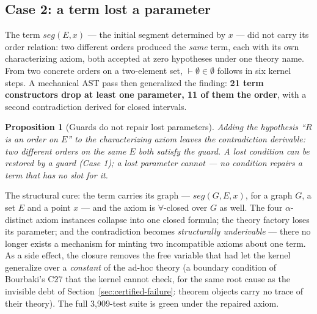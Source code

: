 \documentclass[11pt]{article}
\newtheorem{proposition}{Proposition}
\theoremstyle{remark}\newtheorem{example}{Example}
\begin{document}
\subsection{Case 2: a term lost a parameter}
The term $\mathit{seg}(E,x)$ --- the initial segment determined by $x$ --- did not carry its
order relation: two different orders produced the \emph{same} term, each with its own
characterizing axiom, both accepted at zero hypotheses under one theory name. From two
concrete orders on a two-element set, $\vdash \emptyset \in \emptyset$ follows in six
kernel steps. A mechanical AST pass then generalized the finding: \textbf{21 term
constructors drop at least one parameter, 11 of them the order}, with a second
contradiction derived for closed intervals.

\begin{proposition}[Guards do not repair lost parameters]
Adding the hypothesis ``$R$ is an order on $E$'' to the characterizing axiom leaves
the contradiction derivable: two \emph{different} orders on the same $E$ both satisfy
the guard. A lost \emph{condition} can be restored by a guard (Case 1); a lost
\emph{parameter} cannot --- no condition repairs a term that has no slot for it.
\end{proposition}

The structural cure: the term carries its graph --- $\mathit{seg}(G,E,x)$, for a
graph $G$, a set $E$ and a point $x$ --- and the axiom
is $\forall$-closed over $G$ as well. The four $\alpha$-distinct axiom instances
collapse into one closed formula; the theory factory loses its parameter; and the
contradiction becomes \emph{structurally underivable} --- there no longer exists a
mechanism for minting two incompatible axioms about one term. As a side effect, the
closure removes the free variable that had let the kernel generalize over a
\emph{constant} of the ad-hoc theory (a boundary condition of Bourbaki's C27 that the
kernel cannot check, for the same root cause as the invisible debt of
Section~\ref{sec:certified-failure}: theorem objects carry no trace of their theory).
The full 3{,}909-test suite is green under the repaired axiom.
\end{document}
